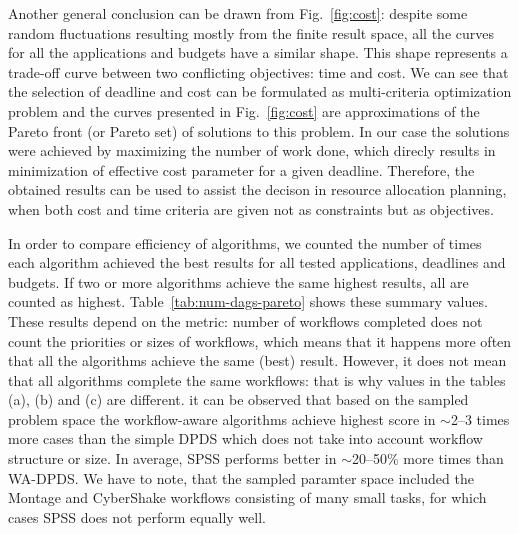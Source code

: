 \documentclass{sig-alternate}
\begin{document}
Another general conclusion can be drawn from Fig.~\ref{fig:cost}: despite some
random fluctuations resulting mostly from the finite result space, all the
curves for all the applications and budgets have a similar shape. This shape
represents a trade-off curve between two conflicting objectives: time and cost.
We can see that the selection of deadline and cost can be formulated as
multi-criteria optimization problem and the curves presented in
Fig.~\ref{fig:cost} are approximations of the Pareto front (or Pareto set) of
solutions to this problem. In our case the solutions were achieved by maximizing
the number of work done, which direcly results in minimization of effective cost parameter for a given
deadline. Therefore, the obtained results can be used to assist the decison in
resource allocation planning, when both cost and time criteria are given not as
constraints but as objectives.


       
               
In order to compare efficiency of algorithms, we counted the number of times
each algorithm achieved the best results for all tested applications, deadlines
and budgets. If two or more algorithms achieve the same highest results, all are
counted as highest. Table~\ref{tab:num-dags-pareto} shows these summary values.
These results depend on the metric: number of workflows completed does not count
the priorities or sizes of workflows, which means that it happens more often
that all the algorithms achieve the same (best) result. However, it does not
mean that all algorithms complete the same workflows: that is why values
in the tables (a), (b) and (c) are different. it can be observed that based on
the sampled problem space the workflow-aware algorithms achieve highest score
in $\sim$2--3 times more cases than the simple DPDS which does not take into
account workflow structure or size. In average, SPSS performs better in
$\sim$20--50\% more times than WA-DPDS. We have to note, that the sampled
paramter space included the Montage and CyberShake workflows consisting of many
small tasks, for which cases SPSS does not perform equally well. 
               
\end{document}
